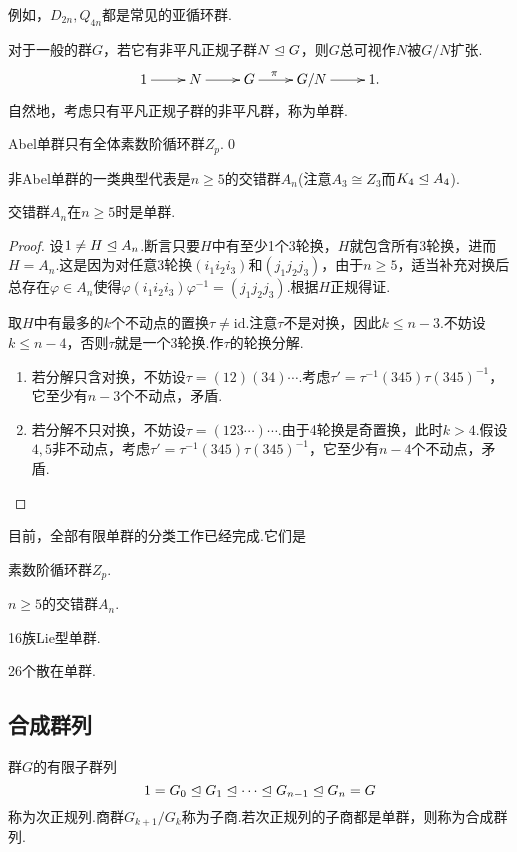 例如，$D_{2n},Q_{4n}$都是常见的亚循环群.

对于一般的群$G$，若它有非平凡正规子群$N\trianglelefteq G$，则$G$总可视作$N$被$G/N$扩张.
\[
	\xymatrix{
		1\ar[r]&N\ar[r]&G\ar[r]^(0.4)\pi&G/N\ar[r]&1.
	}
\]
自然地，考虑只有平凡正规子群的非平凡群，称为{\heiti 单群}.\hypertarget{text:Simple}{}

\begin{prop}
	Abel单群只有全体素数阶循环群$Z_p$.\qed
\end{prop}

非Abel单群的一类典型代表是$n\ge 5$的交错群$A_n$(注意$A_3\cong Z_3$而$K_4\trianglelefteq A_4$).

\begin{thm}
	交错群$A_n$在$n\ge 5$时是单群.
\end{thm}
\begin{proof}
	设$1\ne H\trianglelefteq A_n$.断言只要$H$中有至少1个3轮换，$H$就包含所有3轮换，进而$H=A_n$.这是因为对任意3轮换$(i_1i_2i_3)$和$(j_1j_2j_3)$，由于$n\ge 5$，适当补充对换后总存在$\varphi\in A_n$使得$\varphi(i_1i_2i_3)\varphi^{-1}=(j_1j_2j_3)$.根据$H$正规得证.

	取$H$中有最多的$k$个不动点的置换$\tau\ne\mathrm{id}$.注意$\tau$不是对换，因此$k\le n-3$.不妨设$k\le n-4$，否则$\tau$就是一个3轮换.作$\tau$的轮换分解.
	\begin{enumerate}
		\item 若分解只含对换，不妨设$\tau=(12)(34)\cdots$.考虑$\tau'=\tau^{-1}(345)\tau(345)^{-1}$，它至少有$n-3$个不动点，矛盾.
		\item 若分解不只对换，不妨设$\tau=(123\cdots)\cdots$.由于4轮换是奇置换，此时$k>4$.假设$4,5$非不动点，考虑$\tau'=\tau^{-1}(345)\tau(345)^{-1}$，它至少有$n-4$个不动点，矛盾.
	\end{enumerate}
\end{proof}

目前，全部有限单群的分类工作已经完成.它们是

\noindent\begin{enumerate*}
	\item 素数阶循环群$Z_p$.
	\item $n\ge 5$的交错群$A_n$.
	\item 16族Lie型单群.
	\item 26个散在单群.
\end{enumerate*}

\subsection{合成群列}
\begin{definition}
	群$G$的有限子群列
	\[
		1=G_0\trianglelefteq G_1\trianglelefteq\cdots\trianglelefteq G_{n-1}\trianglelefteq G_n=G
	\]
	称为{\heiti 次正规列}.商群$G_{k+1}/G_k$称为{\heiti 子商}.若次正规列的子商都是单群，则称为{\heiti 合成群列}.
\end{definition}

